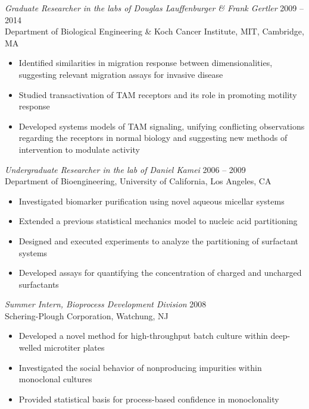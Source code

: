 \documentclass[11pt]{res}
\begin{document}
\begin{resume}
{\sl Graduate Researcher in the labs of Douglas Lauffenburger \& Frank Gertler} \hfill 2009 -- 2014 \\
Department of Biological Engineering \& Koch Cancer Institute, MIT, Cambridge, MA 
\begin{itemize} \itemsep -2pt %
\item Identified similarities in migration response between dimensionalities, suggesting relevant migration  assays for invasive disease
\item Studied transactivation of TAM receptors and its role in promoting motility response
\item Developed systems models of TAM signaling, unifying conflicting observations regarding the receptors in normal biology and suggesting new methods of intervention to modulate activity
\end{itemize}

{\sl Undergraduate Researcher in the lab of Daniel Kamei} \hfill 2006 -- 2009 \\ 
Department of Bioengineering, University of California, Los Angeles, CA 
\begin{itemize} \itemsep -2pt %
\item Investigated biomarker purification using novel aqueous micellar systems
\item Extended a previous statistical mechanics model to nucleic acid partitioning
\item Designed and executed experiments to analyze the partitioning of surfactant systems
\item Developed assays for quantifying the concentration of charged and uncharged surfactants
\end{itemize}

{\sl Summer Intern, Bioprocess Development Division} \hfill 2008 \\ 
Schering-Plough Corporation, Watchung, NJ
\begin{itemize} \itemsep -2pt %
\item Developed a novel method for high-throughput batch culture within deep-welled microtiter plates
\item Investigated the social behavior of nonproducing impurities within monoclonal cultures
\item Provided statistical basis for process-based confidence in monoclonality
\end{itemize}






\end{resume}
\end{document}

